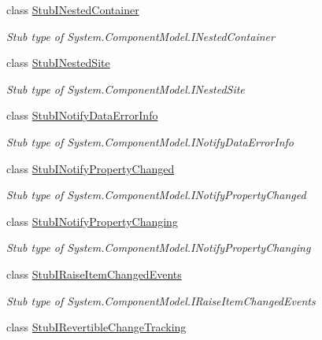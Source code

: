 \begin{DoxyCompactItemize}
class \hyperlink{class_system_1_1_component_model_1_1_fakes_1_1_stub_i_nested_container}{Stub\-I\-Nested\-Container}
\begin{DoxyCompactList}\small\item\em Stub type of System.\-Component\-Model.\-I\-Nested\-Container\end{DoxyCompactList}\item 
class \hyperlink{class_system_1_1_component_model_1_1_fakes_1_1_stub_i_nested_site}{Stub\-I\-Nested\-Site}
\begin{DoxyCompactList}\small\item\em Stub type of System.\-Component\-Model.\-I\-Nested\-Site\end{DoxyCompactList}\item 
class \hyperlink{class_system_1_1_component_model_1_1_fakes_1_1_stub_i_notify_data_error_info}{Stub\-I\-Notify\-Data\-Error\-Info}
\begin{DoxyCompactList}\small\item\em Stub type of System.\-Component\-Model.\-I\-Notify\-Data\-Error\-Info\end{DoxyCompactList}\item 
class \hyperlink{class_system_1_1_component_model_1_1_fakes_1_1_stub_i_notify_property_changed}{Stub\-I\-Notify\-Property\-Changed}
\begin{DoxyCompactList}\small\item\em Stub type of System.\-Component\-Model.\-I\-Notify\-Property\-Changed\end{DoxyCompactList}\item 
class \hyperlink{class_system_1_1_component_model_1_1_fakes_1_1_stub_i_notify_property_changing}{Stub\-I\-Notify\-Property\-Changing}
\begin{DoxyCompactList}\small\item\em Stub type of System.\-Component\-Model.\-I\-Notify\-Property\-Changing\end{DoxyCompactList}\item 
class \hyperlink{class_system_1_1_component_model_1_1_fakes_1_1_stub_i_raise_item_changed_events}{Stub\-I\-Raise\-Item\-Changed\-Events}
\begin{DoxyCompactList}\small\item\em Stub type of System.\-Component\-Model.\-I\-Raise\-Item\-Changed\-Events\end{DoxyCompactList}\item 
class \hyperlink{class_system_1_1_component_model_1_1_fakes_1_1_stub_i_revertible_change_tracking}{Stub\-I\-Revertible\-Change\-Tracking}

\end{DoxyCompactItemize}
